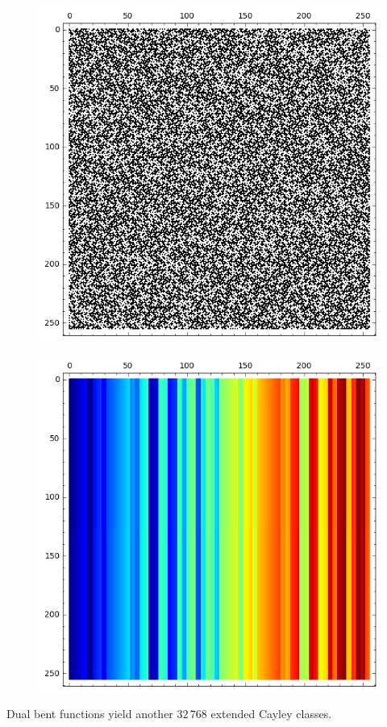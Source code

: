 \documentclass[pdf,sprung,slideColor,nocolorBG]{beamer}
\newenvironment{colortheme}[1]{
\def\ProvidesPackageRCS $##1${\relax}
\renewcommand{\ProcessOptions}{\relax}
\makeatletter

\makeatother
}{}
\begin{document}
\begin{colortheme}{jubata}
\begin{frame}
\begin{figure}
\begin{minipage}{.48\textwidth}
\includegraphics[width=.9\linewidth]{../matrix_plot/cast128_2_16_weight_class_matrix.png}
  \label{fig:cast128_2_16_weight_class_matrix}
\end{minipage}
\begin{minipage}{.48\textwidth}
  \centering
\includegraphics[width=.9\linewidth]{../matrix_plot/cast128_2_16_bent_cayley_graph_index_matrix.png}
  \label{fig:cast128_2_16_bent_cayley_graph_index_matrix}
\end{minipage}%
\end{figure}
Dual bent functions yield another $32\,768$ extended Cayley classes.
\end{frame}


\end{colortheme}
\end{document}
